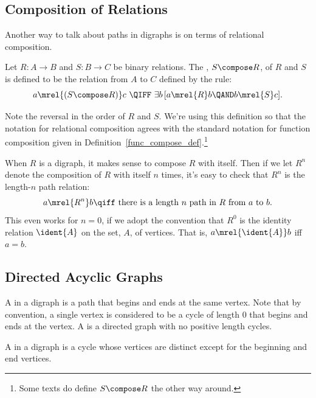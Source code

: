 \subsection{Composition of Relations}\label{relation_compose_subsec}

Another way to talk about paths in digraphs is on terms of relational
composition.  

\begin{definition}
  Let $R:A \to B$ and $S:B \to C$ be binary relations.  The
  , $S \compose R$, of $R$ and $S$ is defined to be the
  relation from $A$ to $C$ defined by the rule:
\begin{displaymath}
a \mrel{(S \compose R)} c\  \QIFF\ \exists b\, [a \mrel{R} b \QAND b \mrel{S} c].
\end{displaymath}
\end{definition}

Note the reversal in the order of $R$ and $S$.  We're using this
definition so that the notation for relational composition agrees with the
standard notation for function composition given in
Definition~\ref{func_compose_def}.\footnote{Some texts do define $S
  \compose R$ the other way around.}

When $R$ is a digraph, it makes sense to compose $R$ with itself.  Then if
we let $R^n$ denote the composition of $R$ with itself $n$ times, it's
easy to check that $R^n$ is the length-$n$ path relation:
\[
a  \mrel{R^n} b \qiff \mbox{ there is a length $n$ path in $R$ from $a$ to $b$}.
\]
This even works for $n=0$, if we adopt the convention that $R^0$ is the
identity relation $\ident{A}$ on the set, $A$, of vertices.  That is, $a
\mrel{\ident{A}} b$ iff $a = b$.

\subsection{Directed Acyclic Graphs}\label{sec:dag}

\begin{definition}
A  in a digraph is a path that begins and ends at the same
vertex.  Note that by convention, a single vertex is considered to be a
cycle of length 0 that begins and ends at the vertex.  A  is a directed graph with no positive length cycles.

A  in a digraph is a cycle whose vertices are distinct
except for the beginning and end vertices.
\end{definition}

